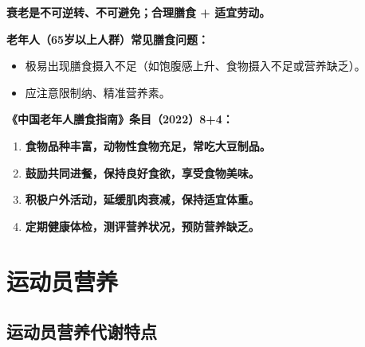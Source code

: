 \begin{keybox}
\textbf{衰老是不可逆转、不可避免；合理膳食 + 适宜劳动。}

\textbf{老年人（65岁以上人群）常见膳食问题：}
\begin{itemize}[leftmargin=*]
    \item 极易出现膳食摄入不足（如饱腹感上升、食物摄入不足或营养缺乏）。
    \item 应注意限制纳、精准营养素。
\end{itemize}

\textbf{《中国老年人膳食指南》条目（2022）8+4：}
\begin{enumerate}[leftmargin=*]
    \item \textbf{食物品种丰富，动物性食物充足，常吃大豆制品。}
    \item \textbf{鼓励共同进餐，保持良好食欲，享受食物美味。}
    \item \textbf{积极户外活动，延缓肌肉衰减，保持适宜体重。}
    \item \textbf{定期健康体检，测评营养状况，预防营养缺乏。}
\end{enumerate}
\end{keybox}

\section{运动员营养}

\subsection{运动员营养代谢特点}

